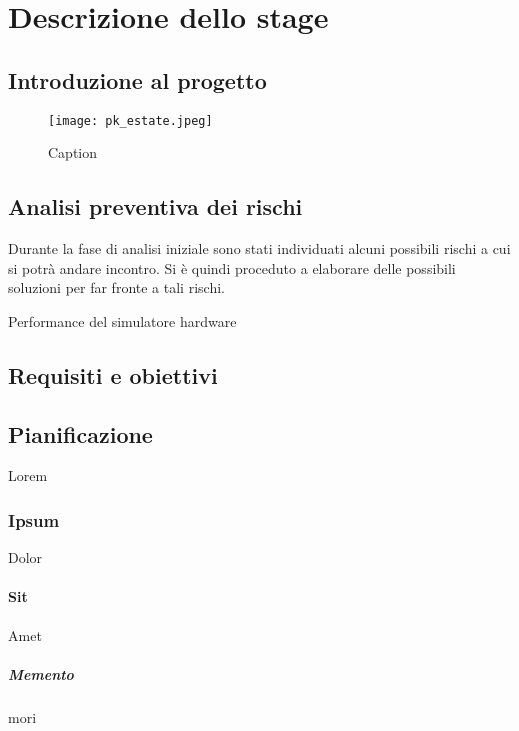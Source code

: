 \chapter{Descrizione dello stage}
\label{cap:descrizione-stage}


\section{Introduzione al progetto}

\begin{figure}[!ht] 
    \centering 
    \texttt{[image: pk\_estate.jpeg]} 
    \caption{Caption}
\end{figure}
\lipsum[1]

\section{Analisi preventiva dei rischi}

Durante la fase di analisi iniziale sono stati individuati alcuni possibili rischi a cui si potrà andare incontro.
Si è quindi proceduto a elaborare delle possibili soluzioni per far fronte a tali rischi.

\begin{risk}{Performance del simulatore hardware}
    \label{risk:hardware-simulator} 
\end{risk}

\section{Requisiti e obiettivi}

\section{Pianificazione}
Lorem

\subsection{Ipsum}
Dolor

\subsubsection{Sit}
Amet

\paragraph{Memento}
mori